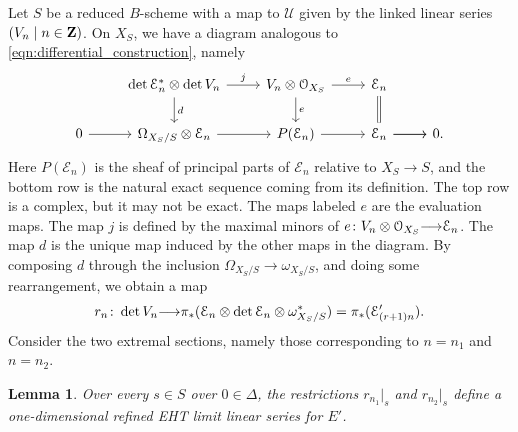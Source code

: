 \documentclass[11pt,reqno]{amsart}
\theoremstyle{plain}
\newtheorem{lemma}[theorem]{Lemma}
\theoremstyle{definition}
\theoremstyle{remark}
\numberwithin{equation}{section}
\renewcommand{\to}{{\longrightarrow}}
\numberwithin{equation}{section}
\renewcommand{\O}{\mathcal O}
\begin{document}
Let $S$ be a reduced $B$-scheme with a map to $\mathcal U$ given by the linked linear series $(V_n \mid n \in {\bf Z})$.
On $X_S$, we have a diagram analogous to \eqref{eqn:differential_construction}, namely
\begin{equation}
  \label{eq:llspr}
  \begin{tikzcd}
    &\det \mathcal E_n^* \otimes \det V_n\ar{r}{j}\ar{d}{d} & V_n \otimes \O_{X_S}\ar{r}{e}\ar{d}{e} & \mathcal E_n\ar[equal]{d}&\\
    0\ar{r} & \Omega_{X_S/S} \otimes \mathcal E_n\ar{r} & P(\mathcal E_n)\ar{r} &\ar{r} \mathcal E_n \ar{r}& 0.
  \end{tikzcd}
\end{equation}
Here $P(\mathcal E_n)$ is the sheaf of principal parts of $\mathcal E_n$ relative to $X_S \to S$, and the bottom row is the natural exact sequence coming from its definition.
The top row is a complex, but it may not be exact.
The maps labeled $e$ are the evaluation maps.
The map $j$ is defined by the maximal minors of $e \from V_n \otimes \O_{X_S} \to \mathcal E_n$.
The map $d$ is the unique map induced by the other maps in the diagram.
By composing $d$ through the inclusion $\Omega_{X_S/S} \to \omega_{X_S/S}$, and doing some rearrangement, we obtain a map
\begin{equation}\label{eqn:Rn}
r_n \from \det V_n \to \mathcal \pi_*(\mathcal E_n \otimes \det \mathcal E_n \otimes \omega^*_{X_S/S}) = \pi_*(\mathcal E'_{(r+1)n}).
\end{equation}
Consider the two extremal sections, namely those corresponding to $n = n_1$ and $n = n_2$.
\begin{lemma}\label{lem:rameht}
  Over every $s \in S$ over $0 \in \Delta$, the restrictions $r_{n_1}|_s$ and $r_{n_2}|_s$ define a one-dimensional refined EHT limit linear series for $E'$.
\end{lemma}
\end{document}
